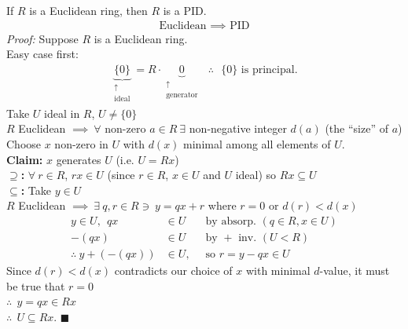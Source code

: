 \begin{theorem}
    If $R$ is a Euclidean ring, then $R$ is a PID.
    \begin{align}
        \boxed{\text{ Euclidean }\implies \text{ PID }}\nonumber
    \end{align}
    \textit{Proof:} Suppose $R$ is a Euclidean ring. \\ \steezybreak
    \noindent Easy case first: 
    \begin{align}
        \underbrace{\{0\}}_{\substack{\uparrow \\  \text{ideal}}} = R\cdot \underbrace{0}_{\substack{\uparrow \\ \text{generator}}} \ \ \ \therefore \ \ \ \{0\} \text{ is principal}. \nonumber
    \end{align}
    Take $U$ ideal in $R$, $U\neq \{0\}$ \\ 
    \noindent $R$ Euclidean $\implies \ \forall$ non-zero $a\in R \ \exists $ non-negative integer $d(a)$ (the ``size'' of $a$) \\
    \noindent Choose $x$ non-zero in $U$ with $d(x)$ minimal among all elements of $U$. \\
    \noindent \textbf{Claim:} $x$ generates $U$ (i.e. $U=Rx$) \\
    \noindent \textbf{$\supseteq$:} $\forall \ r \in R$, $rx\in U$ (since $r\in R$, $x\in U$ and $U$ ideal) so $Rx\subseteq U$ \\
    \noindent \textbf{$\subseteq$:} Take $y\in U$ \\
    \noindent $R$ Euclidean $\implies \ \exists \ q,r \in R \ni \ y=qx+r$ where $r=0$ or $d(r)<d(x)$ \\
    
    \begin{align}
        y\in U, \ \ qx &\in U \ \ &\text{ by absorp. } (q\in R, x\in U) \nonumber \\
        -(qx) &\in U \ \ \ &\text{ by }+ \text{ inv. }(U<R) \nonumber \\
        \therefore \ y+(-(qx)) &\in U, \ &\text{ so }r=y-qx \in U \nonumber
    \end{align}
    Since $d(r)<d(x)$ contradicts our choice of $x$ with minimal $d$-value, it must be true that $r=0$ \\
    \noindent $\therefore \ \ y=qx \in Rx$ \\
    \noindent $\therefore \ \ U\subseteq Rx$. $\blacksquare$
\end{theorem}

